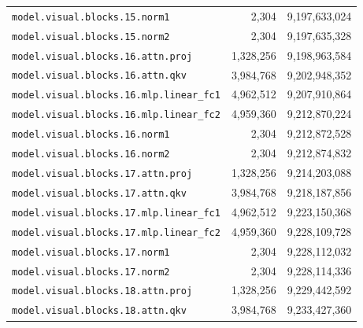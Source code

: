 \documentclass[10pt,a4paper]{article}
\theoremstyle{definition}
\begin{document}
\begin{appendices}
\begin{longtable}{p{9.5cm}rr}
\texttt{model.\allowbreak{}visual.\allowbreak{}blocks.\allowbreak{}15.\allowbreak{}norm1} & 2,304 & 9,197,633,024 \\
\texttt{model.\allowbreak{}visual.\allowbreak{}blocks.\allowbreak{}15.\allowbreak{}norm2} & 2,304 & 9,197,635,328 \\
\texttt{model.\allowbreak{}visual.\allowbreak{}blocks.\allowbreak{}16.\allowbreak{}attn.\allowbreak{}proj} & 1,328,256 & 9,198,963,584 \\
\texttt{model.\allowbreak{}visual.\allowbreak{}blocks.\allowbreak{}16.\allowbreak{}attn.\allowbreak{}qkv} & 3,984,768 & 9,202,948,352 \\
\texttt{model.\allowbreak{}visual.\allowbreak{}blocks.\allowbreak{}16.\allowbreak{}mlp.\allowbreak{}linear\_fc1} & 4,962,512 & 9,207,910,864 \\
\texttt{model.\allowbreak{}visual.\allowbreak{}blocks.\allowbreak{}16.\allowbreak{}mlp.\allowbreak{}linear\_fc2} & 4,959,360 & 9,212,870,224 \\
\texttt{model.\allowbreak{}visual.\allowbreak{}blocks.\allowbreak{}16.\allowbreak{}norm1} & 2,304 & 9,212,872,528 \\
\texttt{model.\allowbreak{}visual.\allowbreak{}blocks.\allowbreak{}16.\allowbreak{}norm2} & 2,304 & 9,212,874,832 \\
\texttt{model.\allowbreak{}visual.\allowbreak{}blocks.\allowbreak{}17.\allowbreak{}attn.\allowbreak{}proj} & 1,328,256 & 9,214,203,088 \\
\texttt{model.\allowbreak{}visual.\allowbreak{}blocks.\allowbreak{}17.\allowbreak{}attn.\allowbreak{}qkv} & 3,984,768 & 9,218,187,856 \\
\texttt{model.\allowbreak{}visual.\allowbreak{}blocks.\allowbreak{}17.\allowbreak{}mlp.\allowbreak{}linear\_fc1} & 4,962,512 & 9,223,150,368 \\
\texttt{model.\allowbreak{}visual.\allowbreak{}blocks.\allowbreak{}17.\allowbreak{}mlp.\allowbreak{}linear\_fc2} & 4,959,360 & 9,228,109,728 \\
\texttt{model.\allowbreak{}visual.\allowbreak{}blocks.\allowbreak{}17.\allowbreak{}norm1} & 2,304 & 9,228,112,032 \\
\texttt{model.\allowbreak{}visual.\allowbreak{}blocks.\allowbreak{}17.\allowbreak{}norm2} & 2,304 & 9,228,114,336 \\
\texttt{model.\allowbreak{}visual.\allowbreak{}blocks.\allowbreak{}18.\allowbreak{}attn.\allowbreak{}proj} & 1,328,256 & 9,229,442,592 \\
\texttt{model.\allowbreak{}visual.\allowbreak{}blocks.\allowbreak{}18.\allowbreak{}attn.\allowbreak{}qkv} & 3,984,768 & 9,233,427,360 \\

\end{longtable}
\end{appendices}
\end{document}
